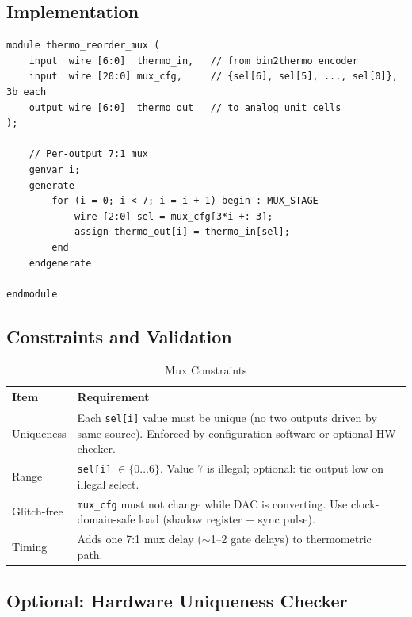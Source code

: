 \documentclass[11pt,a4paper]{article}
\begin{document}
\subsection{Implementation}

\begin{lstlisting}[caption={Thermometric Reorder Mux}]
module thermo_reorder_mux (
    input  wire [6:0]  thermo_in,   // from bin2thermo encoder
    input  wire [20:0] mux_cfg,     // {sel[6], sel[5], ..., sel[0]}, 3b each
    output wire [6:0]  thermo_out   // to analog unit cells
);

    // Per-output 7:1 mux
    genvar i;
    generate
        for (i = 0; i < 7; i = i + 1) begin : MUX_STAGE
            wire [2:0] sel = mux_cfg[3*i +: 3];
            assign thermo_out[i] = thermo_in[sel];
        end
    endgenerate

endmodule
\end{lstlisting}

\subsection{Constraints and Validation}

\begin{table}[h]
\centering
\begin{tabular}{@{}lp{10cm}@{}}
\toprule
\textbf{Item} & \textbf{Requirement} \\
\midrule
Uniqueness   & Each \texttt{sel[i]} value must be unique (no two outputs driven by same source). Enforced by configuration software or optional HW checker. \\
Range        & \texttt{sel[i]} $\in \{0\ldots6\}$. Value 7 is illegal; optional: tie output low on illegal select. \\
Glitch-free  & \texttt{mux\_cfg} must not change while DAC is converting. Use clock-domain-safe load (shadow register + sync pulse). \\
Timing       & Adds one 7:1 mux delay ($\sim$1--2 gate delays) to thermometric path. \\
\bottomrule
\end{tabular}
\caption{Mux Constraints}
\end{table}

\subsection{Optional: Hardware Uniqueness Checker}
\end{document}
